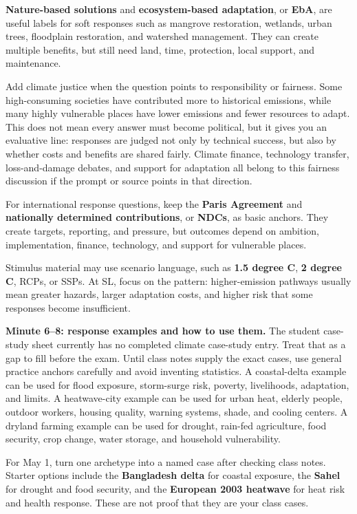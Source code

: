 \documentclass[11pt,a4paper]{article}
\newcommand{\term}[1]{\textcolor{HeadingBlue}{\textbf{#1}}}
\begin{document}
\term{Nature-based solutions} and \term{ecosystem-based adaptation}, or
\term{EbA}, are useful labels for soft responses such as mangrove restoration,
wetlands, urban trees, floodplain restoration, and watershed management. They
can create multiple benefits, but still need land, time, protection, local
support, and maintenance.

Add climate justice when the question points to responsibility or fairness.
Some high-consuming societies have contributed more to historical emissions,
while many highly vulnerable places have lower emissions and fewer resources to
adapt. This does not mean every answer must become political, but it gives you
an evaluative line: responses are judged not only by technical success, but
also by whether costs and benefits are shared fairly. Climate finance,
technology transfer, loss-and-damage debates, and support for adaptation all
belong to this fairness discussion if the prompt or source points in that
direction.

For international response questions, keep the \term{Paris Agreement} and
\term{nationally determined contributions}, or \term{NDCs}, as basic anchors.
They create targets, reporting, and pressure, but outcomes depend on ambition,
implementation, finance, technology, and support for vulnerable places.

Stimulus material may use scenario language, such as \term{1.5 degree C},
\term{2 degree C}, RCPs, or SSPs. At SL, focus on the pattern: higher-emission
pathways usually mean greater hazards, larger adaptation costs, and higher risk
that some responses become insufficient.

\textbf{Minute 6--8: response examples and how to use them.}
The student case-study sheet currently has no completed climate case-study
entry. Treat that as a gap to fill before the exam. Until class notes supply
the exact cases, use general practice anchors carefully and avoid inventing
statistics. A coastal-delta example can be used for flood exposure,
storm-surge risk, poverty, livelihoods, adaptation, and limits. A heatwave-city
example can be used for urban heat, elderly people, outdoor workers, housing
quality, warning systems, shade, and cooling centers. A dryland farming example
can be used for drought, rain-fed agriculture, food security, crop change,
water storage, and household vulnerability.

For May 1, turn one archetype into a named case after checking class notes.
Starter options include the \term{Bangladesh delta} for coastal exposure, the
\term{Sahel} for drought and food security, and the \term{European 2003
heatwave} for heat risk and health response. These are not proof that they are
your class cases.
\end{document}
